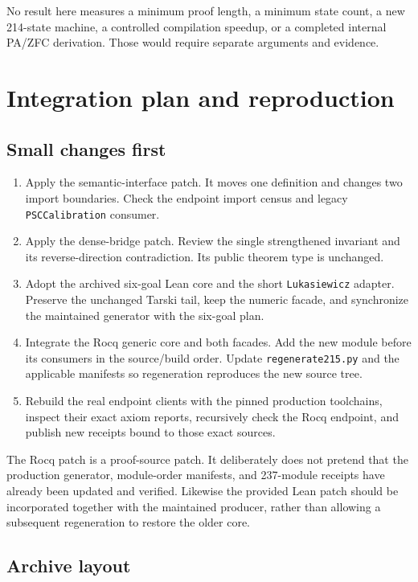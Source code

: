 \documentclass[11pt]{article}
\begin{document}
No result here measures a minimum proof length, a minimum state count, a new 214-state machine, a controlled compilation speedup, or a completed internal PA/ZFC derivation. Those would require separate arguments and evidence.

\section{Integration plan and reproduction}

\subsection{Small changes first}

\begin{enumerate}
\item Apply the semantic-interface patch. It moves one definition and changes two import boundaries. Check the endpoint import census and legacy \texttt{PSCCalibration} consumer.
\item Apply the dense-bridge patch. Review the single strengthened invariant and its reverse-direction contradiction. Its public theorem type is unchanged.
\item Adopt the archived six-goal Lean core and the short \texttt{Lukasiewicz} adapter. Preserve the unchanged Tarski tail, keep the numeric facade, and synchronize the maintained generator with the six-goal plan.
\item Integrate the Rocq generic core and both facades. Add the new module before its consumers in the source/build order. Update \texttt{regenerate215.py} and the applicable manifests so regeneration reproduces the new source tree.
\item Rebuild the real endpoint clients with the pinned production toolchains, inspect their exact axiom reports, recursively check the Rocq endpoint, and publish new receipts bound to those exact sources.
\end{enumerate}

The Rocq patch is a proof-source patch. It deliberately does not pretend that the production generator, module-order manifests, and 237-module receipts have already been updated and verified. Likewise the provided Lean patch should be incorporated together with the maintained producer, rather than allowing a subsequent regeneration to restore the older core.

\subsection{Archive layout}
\end{document}
